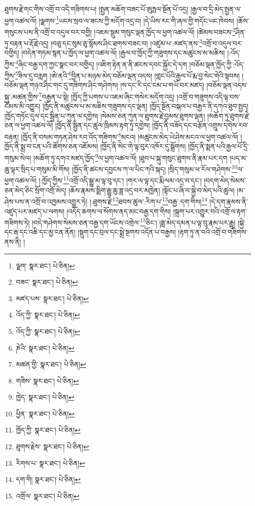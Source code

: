 ཐུགས་རྗེ་གང་གིས་འགྲོ་བ་འདི་གཟིགས་པ། །སྤྱན་མཆོག་བཟང་པོ་ཨུཏྤལ་སྔོན་པོ་འདྲ། །རྒྱལ་བ་དྲི་མེད་སྤྱན་ལ་ཕྱག་འཚལ་ལོ། །ལྗགས་\footnote{ལྗག་  སྣར་ཐང་།  པེ་ཅིན། }ཡངས་སྲབ་ལ་ཟངས་ཀྱི་མདོག་འདྲ་བ། །དེ་ཡིས་རང་གི་ཞལ་གྱི་གདོང་ཡང་ཁེབས། །ཆོས་གསུངས་པས་ནི་འགྲོ་བ་འདུལ་བར་བགྱི། །འཇམ་སྡུམ་གསུང་ལྡན་ཁྱོད་ལ་ཕྱག་འཚལ་ལོ། །ཚེམས་བཟངས་\footnote{བཟང་  སྣར་ཐང་།  པེ་ཅིན། }ཤིན་ཏུ་བརྟན་པ་རྡོ་རྗེ་འདྲ། །བཅུ་དང་སུམ་ཅུ་སྙོམས་ཤིང་ཐགས་བཟང་བ། །འཛུམ་པ་:མཛད་ནས་\footnote{མཛད་པས་  སྣར་ཐང་།  པེ་ཅིན། }འགྲོ་བ་འདུལ་བར་བགྱིད། །བདེན་གཏམ་སྙན་པ་ཁྱོད་ལ་ཕྱག་འཚལ་ལོ། །རྒྱལ་བ་ཁྱོད་ཀྱི་གཟུགས་དང་མཚུངས་མ་མཆིས། །:འོད་ཀྱིས་\footnote{འོད་ཀྱི་  སྣར་ཐང་།  པེ་ཅིན། }ཞིང་བརྒྱ་དག་ཀྱང་སྣང་བར་བགྱིད། །འཇིག་རྟེན་ན་ནི་ཚངས་དབང་སྐྱོང་དེ་དག །བཅོམ་ལྡན་ཁྱོད་ཀྱི་:འོད་ཀྱིས་\footnote{འོད་ཀྱི་  སྣར་ཐང་།  པེ་ཅིན། }ཟིལ་དུ་བརླག །ཨེ་ནའི་\footnote{ཎེའི་  སྣར་ཐང་།  པེ་ཅིན། }བྱིན་པ་མཉམ་མེད་བཅོམ་ལྡན་འདས། །གླང་པོའི་རྒྱལ་པོ་རྨ་བྱ་སེང་གེའི་སྟབས། །བཅོམ་ལྡན་གཉའ་ཤིང་གང་དུ་གཟིགས་ཤིང་གཤེགས། །ས་དང་རི་དང་ངམ་པ་གཡོ་བར་མཛད། །བཅོམ་ལྡན་འདས་སྐུ་:མཚན་གྱིས་\footnote{མཚན་གྱི་  སྣར་ཐང་།  པེ་ཅིན། }བརྒྱན་པ་སྟེ། །ཁྱོད་ཀྱི་པགས་པ་འཇམ་ཞིང་གསེར་མདོག་འདྲ། །འགྲོ་བ་གཟུགས་འདི་ལྟ་བས་ངོམས་མི་འགྱུར། །ཁྱོད་ནི་མཚུངས་པ་མ་མཆིས་གཟུགས་དང་ལྡན། །ཁྱོད་སྔོན་བསྐལ་པ་བརྒྱར་ནི་དཀའ་ཐུབ་སྤྱད། །ཁྱོད་གཏོང་དུལ་དང་སྦྱིན་པ་ཀུན་ལ་དགྱེས། །སེམས་ཅན་ཀུན་ལ་ཐུགས་རྗེ་བྱམས་ཐུགས་ལྡན། །མཆོག་ཏུ་ཐུགས་རྗེ་ཅན་ལ་ཕྱག་འཚལ་ལོ། །ཁྱོད་ནི་སྦྱིན་དང་ཚུལ་ཁྲིམས་རྟག་ཏུ་དགྱེས། །ཁྱོད་ནི་བཟོད་དང་བརྩོན་འགྲུས་དགེས་རབ་བརྟན། །ཁྱོད་ནི་བསམ་གཏན་ཤེས་རབ་འོད་གཟིགས་\footnote{གཟིས་  སྣར་ཐང་།  པེ་ཅིན། }མངའ། །མཚུངས་མེད་ཡེ་ཤེས་མངའ་ལ་ཕྱག་འཚལ་ལོ། །ཁྱོད་ནི་སྨྲ་བ་ངན་པའི་ཚོགས་ཅན་འཇོམས། །ཁྱོད་ནི་སེང་གེ་ལྟ་བུར་འཁོར་དུ་སྒྲོགས། །ཁྱོད་ནི་སྨན་པའི་རྒྱལ་པོ་དྲི་གསུམ་སེལ། །མཆོག་ཏུ་དགའ་མཛད་ཁྱོད་\footnote{ཁྱེད་  སྣར་ཐང་།  པེ་ཅིན། }ལ་ཕྱག་འཚལ་ལོ། །ཐུབ་པ་སྐུ་གསུང་ཐུགས་ནི་རྣམ་པར་དག །པད་མ་ཆུ་ལྟར་སྲིད་པ་གསུམ་མི་གོས། །ཁྱོད་ནི་ཚངས་དབྱངས་ཀ་ལ་པིང་ཀའི་སྐད། །སྲིད་གསུམ་ཕ་རོལ་གཤེགས་\footnote{ཕྱིན་  སྣར་ཐང་།  པེ་ཅིན། }ལ་ཕྱག་འཚལ་ལོ། །:ཁྱོད་ཀྱིས་\footnote{ཁྱོད་ཀྱི་  སྣར་ཐང་།  པེ་ཅིན། }འགྲོ་འདི་སྒྱུ་མ་ལྟ་བུ་དང་། །གར་ལ་ལྟ་དང་རྨི་ལམ་འདྲ་བ་དང་། །བདག་མེད་སེམས་ཅན་མེད་ཅིང་སྲོག་འགྲོ་མེད། །ཆོས་རྣམས་སྨིག་རྒྱུ་ཆུ་ཟླ་འདྲ་བར་མཁྱེན། །སྟོང་པ་ཞི་བ་སྐྱེ་བ་མེད་པའི་ཚུལ། །མ་ཤེས་པས་ན་འགྲོ་བ་འཁྱམས་འགྱུར་ཏེ། །:ཐུགས་རྗེ་\footnote{ཐུགས་རྗེས་  སྣར་ཐང་།  པེ་ཅིན། }ཐབས་ཚུལ་:རིག་པ་\footnote{རིགས་པ་  སྣར་ཐང་།  པེ་ཅིན། }བརྒྱ་:དག་གིས།\footnote{དག་གི།  སྣར་ཐང་།  པེ་ཅིན། } །དེ་དག་རྣམས་ནི་འཛུད་པར་མཛད་པ་ལགས། །འདོད་ཆགས་ལ་སོགས་ནད་མང་བརྒྱ་དག་གིས། །སྐྲག་པར་འགྱུར་བའི་འགྲོ་ལ་རྟག་གཟིགས་ཏེ། །བདེ་གཤེགས་སེམས་ཅན་བརྒྱ་དག་ཡོངས་འགྲེལ་\footnote{འགྲོལ་  སྣར་ཐང་།  པེ་ཅིན། }ཅིང་། །ཟླ་མེད་དམན་པ་ལྟ་བུ་རྣམ་པར་རྒྱུ། །སྐྱེ་དང་རྒ་དང་འཆི་དང་མྱ་ངན་ནོན། །སྡུག་དང་བྲལ་དང་སྨྲེ་སྔགས་འདོན་པ་བརྒྱས། །རྟག་ཏུ་ན་བའི་འགྲོ་བ་གཟིགས་ནས་ནི། །
